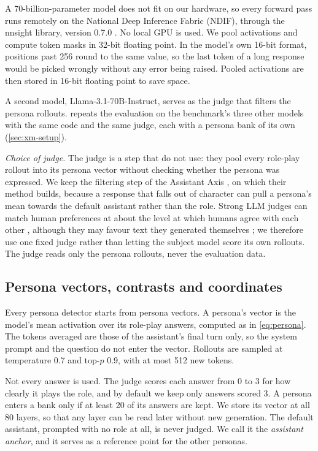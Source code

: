 A 70-billion-parameter model does not fit on our hardware, so every forward pass runs remotely on
the National Deep Inference Fabric (NDIF), through the nnsight library, version 0.7.0
\cite{fiottokaufman2024nnsight}. No local GPU is used.
We pool activations and compute token masks in 32-bit floating point. In the model's own 16-bit
format, positions past 256 round to the same value, so the last token of a long response would be
picked wrongly without any error being raised. Pooled activations are then stored in 16-bit
floating point to save space.

A second model, Llama-3.1-70B-Instruct, serves as the judge that filters the persona rollouts.
 repeats the evaluation on the benchmark's three other models with the same code and
the same judge, each with a persona bank of its own (\cref{sec:xm-setup}).

\emph{Choice of judge.} The judge is a step that \textcite{mahadik2026persona} do not use: they pool
every role-play rollout into its persona vector without checking whether the persona was expressed.
We keep the filtering step of the Assistant Axis \cite{lu2026assistant}, on which their method
builds, because a response that falls out of character can pull a persona's mean towards the default
assistant rather than the role. Strong LLM judges can match human preferences at about the level at
which humans agree with each other \cite{zheng2023judging}, although they may favour text they
generated themselves \cite{panickssery2024llm}; we therefore use one fixed judge rather than letting
the subject model score its own rollouts. The judge reads only the persona rollouts, never the
evaluation data.

\subsection{Persona vectors, contrasts and coordinates}
\label{sec:directions}

Every persona detector starts from persona vectors. A persona's vector is the model's mean
activation over its role-play answers, computed as in \cref{eq:persona}. The tokens averaged are
those of the assistant's final turn only, so the system prompt and the question do not enter the
vector. Rollouts are sampled at temperature 0.7 and top-$p$ 0.9, with at most 512 new tokens.

Not every answer is used. The judge scores each answer from 0 to 3 for how clearly it plays the
role, and by default we keep only answers scored 3. A persona enters a bank only if at least 20 of
its answers are kept. We store its vector at all 80 layers, so that any layer can be read later
without new generation. The default assistant, prompted with no role at all, is never judged. We
call it the \emph{assistant anchor}, and it serves as a reference point for the other personas.

